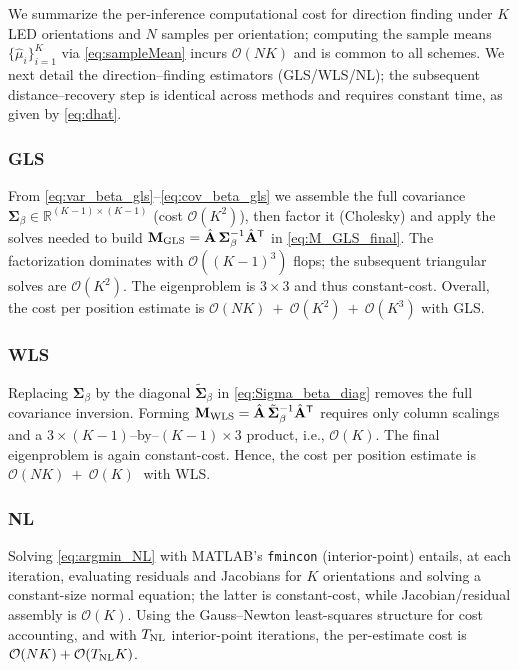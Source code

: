 \documentclass[journal]{IEEEtran}
\begin{document}
We summarize the per-inference computational cost for direction finding under \(K\) LED orientations and \(N\) samples per orientation; computing the sample means \(\{\hat{\mu}_i\}_{i=1}^{K}\) via \eqref{eq:sampleMean} incurs \(\mathcal{O}(NK)\) and is common to all schemes. We next detail the direction–finding estimators (GLS/WLS/NL); the subsequent distance–recovery step is identical across methods and requires constant time, as given by \eqref{eq:dhat}.

\subsubsection{GLS}
From \eqref{eq:var_beta_gls}–\eqref{eq:cov_beta_gls} we assemble the full covariance
\(\mathbf{\Sigma}_\beta\in\mathbb{R}^{(K-1)\times(K-1)}\) (cost \(\mathcal{O}(K^2)\)), then factor it (Cholesky) and apply the solves needed to build \(\mathbf{M}_{\rm GLS}=\hat{\mathbf A}\,\mathbf{\Sigma}_\beta^{-1}\hat{\mathbf A}^{\mathsf T}\) in \eqref{eq:M_GLS_final}. The factorization dominates with \(\mathcal{O}((K-1)^3)\) flops; the subsequent triangular solves are \(\mathcal{O}(K^2)\).
The eigenproblem is \(3\times3\) and thus constant-cost. Overall, the cost per position estimate is $\mathcal{O}(NK)~+~\mathcal{O}(K^2)~+~\mathcal{O}(K^3)$
with GLS.

\subsubsection{WLS}
Replacing \(\mathbf{\Sigma}_\beta\) by the diagonal \(\tilde{\mathbf{\Sigma}}_\beta\) in \eqref{eq:Sigma_beta_diag} removes the full covariance inversion. Forming \(\mathbf{M}_{\rm WLS}=\hat{\mathbf A}\,\tilde{\mathbf{\Sigma}}_\beta^{-1}\hat{\mathbf A}^{\mathsf T}\) requires only column scalings and a \(3\times( K-1)\)–by–\((K-1)\times 3\) product, i.e., \(\mathcal{O}(K)\). The final eigenproblem is again constant-cost. Hence, the cost per position estimate is 
\(
\mathcal{O}(NK)~+~\mathcal{O}(K)\;
\)
with WLS.

\subsubsection{NL}
Solving \eqref{eq:argmin_NL} with MATLAB's \texttt{fmincon} (interior-point) entails, at each iteration, evaluating residuals and Jacobians for \(K\) orientations and solving a constant-size normal equation; the latter is constant-cost, while Jacobian/residual assembly is \(\mathcal{O}(K)\). Using the Gauss–Newton least-squares structure for cost accounting, and with \(T_{\rm NL}\) interior-point iterations, the per-estimate cost is \(\mathcal{O}(NK)+\mathcal{O}(T_{\rm NL}K)\).
\end{document}
